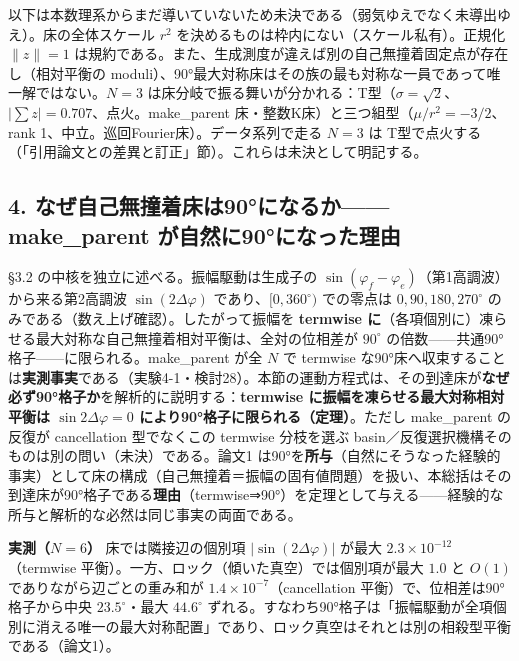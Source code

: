 \documentclass[
  a4paper,
]{ltjsarticle}
\begin{document}
以下は本数理系からまだ導いていないため未決である（弱気ゆえでなく未導出ゆえ）。床の全体スケール
\(r^2\) を決めるものは枠内にない（スケール私有）。正規化 \(\|z\|=1\)
は規約である。また、生成測度が違えば別の自己無撞着固定点が存在し（相対平衡の
moduli）、90°最大対称床はその族の最も対称な一員であって唯一解ではない。\(N=3\)
は床分岐で振る舞いが分かれる：T型（\(\sigma=\sqrt2\)、\(|\sum z|=0.707\)、点火。make\_parent
床・整数K床）と三つ組型（\(\mu/r^2=-3/2\)、rank
1、中立。巡回Fourier床）。データ系列で走る \(N=3\) は
T型で点火する（「引用論文との差異と訂正」節）。これらは未決として明記する。

\subsection{4. なぜ自己無撞着床は90°になるか------make\_parent
が自然に90°になった理由}\label{ux306aux305cux81eaux5df1ux7121ux649eux7740ux5e8aux306f90ux306bux306aux308bux304bmake_parent-ux304cux81eaux7136ux306b90ux306bux306aux3063ux305fux7406ux7531}

§3.2 の中核を独立に述べる。振幅駆動は生成子の
\(\sin(\varphi_f-\varphi_e)\)（第1高調波）から来る第2高調波
\(\sin(2\Delta\varphi)\) であり、\([0,360^\circ)\) での零点は
\(0,90,180,270^\circ\) のみである（数え上げ確認）。したがって振幅を
\textbf{termwise
に}（各項個別に）凍らせる最大対称な自己無撞着相対平衡は、全対の位相差が
\(90^\circ\) の倍数------共通90°格子------に限られる。make\_parent が全
\(N\) で termwise
な90°床へ収束することは\textbf{実測事実}である（実験4-1・検討28）。本節の運動方程式は、その到達床が\textbf{なぜ必ず90°格子か}を解析的に説明する：\textbf{termwise
に振幅を凍らせる最大対称相対平衡は \(\sin2\Delta\varphi=0\)
により90°格子に限られる（定理）}。ただし make\_parent の反復が
cancellation 型でなくこの termwise 分枝を選ぶ
basin／反復選択機構そのものは別の問い（未決）である。論文1
は90°を\textbf{所与}（自然にそうなった経験的事実）として床の構成（自己無撞着＝振幅の固有値問題）を扱い、本総括はその到達床が90°格子である\textbf{理由}（termwise⇒90°）を定理として与える------経験的な所与と解析的な必然は同じ事実の両面である。

\textbf{実測（\(N=6\)）} 床では隣接辺の個別項 \(|\sin(2\Delta\varphi)|\)
が最大 \(2.3\times10^{-12}\)（termwise
平衡）。一方、ロック（傾いた真空）では個別項が最大 \(1.0\) と \(O(1)\)
でありながら辺ごとの重み和が \(1.4\times10^{-7}\)（cancellation
平衡）で、位相差は90°格子から中央 \(23.5^\circ\)・最大 \(44.6^\circ\)
ずれる。すなわち90°格子は「振幅駆動が全項個別に消える唯一の最大対称配置」であり、ロック真空はそれとは別の相殺型平衡である（論文1）。
\end{document}
